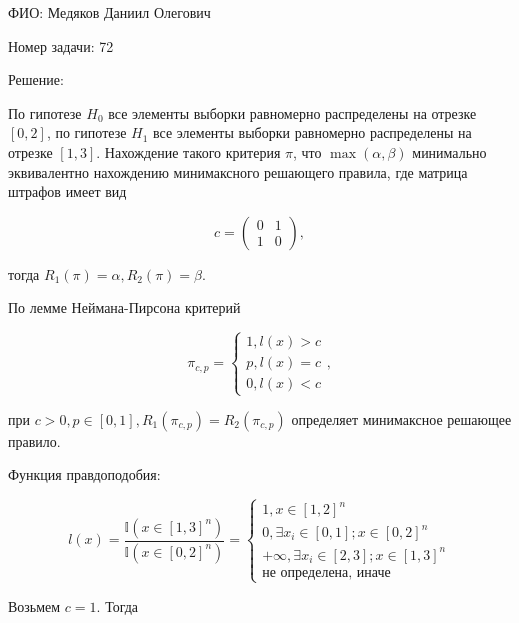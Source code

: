 \documentclass[14pt]{extarticle}
\begin{document}
ФИО: Медяков Даниил Олегович

\vspace{10pt}

Номер задачи: 72

\vspace{10pt}

Решение:

\vspace{10pt}

По гипотезе $H_0$ все элементы выборки равномерно распределены на отрезке $[0, 2]$, по гипотезе $H_1$ все элементы выборки равномерно распределены на отрезке $[1, 3]$. Нахождение такого критерия $\pi$, что $\max(\alpha, \beta)$ минимально эквивалентно нахождению минимаксного решающего правила, где матрица штрафов имеет вид 

\begin{equation*}
    c = 
    \begin{pmatrix}
      0& 1\\
      1& 0
    \end{pmatrix},
\end{equation*}

тогда $R_1(\pi) = \alpha, R_2(\pi) = \beta$.

По лемме Неймана-Пирсона критерий

\begin{equation*}
    \pi_{c,p} = 
    \begin{cases}
        1, l(x) > c\\
        p, l(x) = c\\
        0, l(x) < c
    \end{cases},
\end{equation*}

при $c > 0, p\in[0, 1], R_1(\pi_{c,p}) = R_2(\pi_{c,p})$ определяет минимаксное решающее правило. 

Функция правдоподобия:

\begin{equation*}
    l(x) = \frac{\mathbb I(x\in[1, 3]^n)}{\mathbb I(x\in[0, 2]^n)} = 
    \begin{cases}
        1, x\in[1, 2]^n\\
        0, \exists x_i\in[0,1]; x\in[0,2]^n\\
        +\infty, \exists x_i\in[2,3]; x\in[1,3]^n\\
        \text{не определена, иначе}
    \end{cases}
\end{equation*}

Возьмем $c = 1$. Тогда
\end{document}
